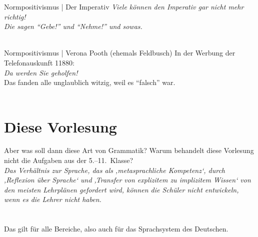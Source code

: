 \begin{frame}
  {Normpositivismus | Der Imperativ}
  \onslide<+->
  \onslide<+->
  \centering 
  \textit{Viele können den Imperativ gar nicht mehr richtig!}\\
  \Zeile
  \onslide<+->
  \alert{\LARGE\textit{Die sagen "`Gebe!"' und "`Nehme!"' und sowas.}\\}
  \onslide<+->
  \Zeile
  \\
  \onslide<+->
  \Halbzeile
\end{frame}

\begin{frame}
  {Normpositivismus | Verona Pooth (ehemals Feldbusch)}
  \onslide<+->
  \onslide<+->
  \centering 
  In der Werbung der Telefonauskunft 11880:\\
  \Zeile
  \onslide<+->
  \alert{\LARGE\textit{Da werden Sie geholfen!}}\\
  \onslide<+->
  \Zeile
  Das fanden alle unglaublich witzig, weil es "`falsch"' war.\\
  \onslide<+->
  \Zeile
  \centering 
  \\
  \onslide<+->
  \Halbzeile
\end{frame}




\section{Diese Vorlesung}

\begin{frame}
  {Aber was soll dann diese Art von Grammatik?}
  \onslide<+->
  \onslide<+->
  \alert{Warum behandelt diese Vorlesung nicht die Aufgaben aus der 5.--11.~Klasse?}\\
  \onslide<+->
  \Zeile
  \textit{Das Verhältnis zur Sprache, das als ‚metasprachliche Kompetenz‘, durch ‚Reflexion über Sprache‘ und ‚Transfer von explizitem zu implizitem Wissen‘ von den meisten Lehrplänen gefordert wird, können die Schüler nicht entwickeln, wenn es die Lehrer nicht haben.}\\
  \Viertelzeile
  \\
  \Doppelzeile 
  \centering
  \onslide<+->
  \\
  \Viertelzeile
  \onslide<+->
  \alert{Das gilt für alle Bereiche, also auch für das Sprachsystem des Deutschen.}
\end{frame}

